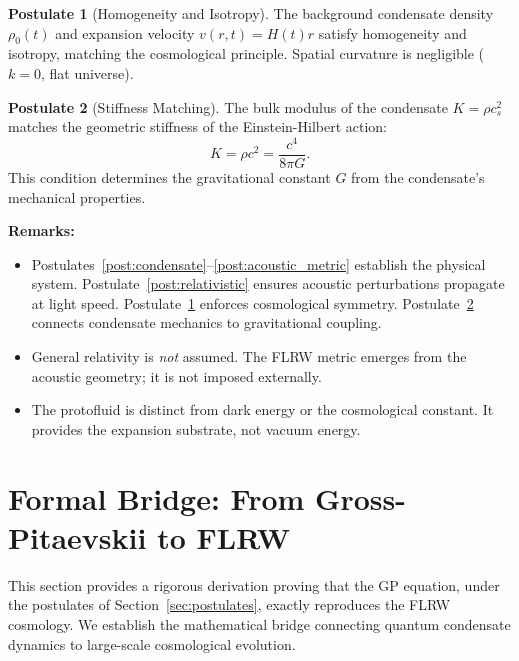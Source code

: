 \documentclass[11pt,a4paper]{article}
\theoremstyle{definition}
\newtheorem{postulate}{Postulate}
\theoremstyle{remark}
\begin{document}
\begin{postulate}[Homogeneity and Isotropy]
\label{post:homogeneity}
The background condensate density $\rho_0(t)$ and expansion velocity $v(r,t) = H(t)r$ satisfy homogeneity and isotropy, matching the cosmological principle. Spatial curvature is negligible ($k=0$, flat universe).
\end{postulate}

\begin{postulate}[Stiffness Matching]
\label{post:stiffness_matching}
The bulk modulus of the condensate $K = \rho c_s^2$ matches the geometric stiffness of the Einstein-Hilbert action:
\begin{equation}
K = \rho c^2 = \frac{c^4}{8\pi G}.
\end{equation}
This condition determines the gravitational constant $G$ from the condensate's mechanical properties.
\end{postulate}

\textbf{Remarks:}
\begin{itemize}[leftmargin=*, itemsep=0.2em]
\item Postulates~\ref{post:condensate}--\ref{post:acoustic_metric} establish the physical system. Postulate~\ref{post:relativistic} ensures acoustic perturbations propagate at light speed. Postulate~\ref{post:homogeneity} enforces cosmological symmetry. Postulate~\ref{post:stiffness_matching} connects condensate mechanics to gravitational coupling.
\item General relativity is \emph{not} assumed. The FLRW metric emerges from the acoustic geometry; it is not imposed externally.
\item The protofluid is distinct from dark energy or the cosmological constant. It provides the expansion substrate, not vacuum energy.
\end{itemize}

\section{Formal Bridge: From Gross-Pitaevskii to FLRW}
\label{sec:formal_bridge}

This section provides a rigorous derivation proving that the GP equation, under the postulates of Section~\ref{sec:postulates}, exactly reproduces the FLRW cosmology. We establish the mathematical bridge connecting quantum condensate dynamics to large-scale cosmological evolution.
\end{document}
